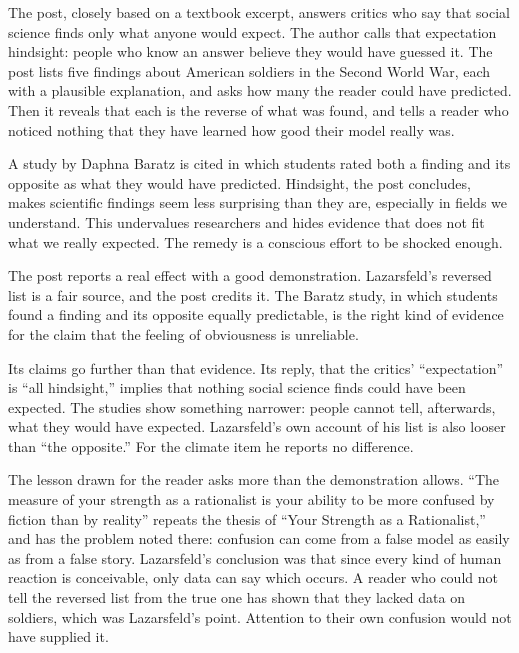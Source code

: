 \begin{afterword}
\summaryhead

The post, closely based on a textbook excerpt, answers critics who say that social science finds only what anyone would expect. The author calls that expectation hindsight: people who know an answer believe they would have guessed it. The post lists five findings about American soldiers in the Second World War, each with a plausible explanation, and asks how many the reader could have predicted. Then it reveals that each is the reverse of what was found, and tells a reader who noticed nothing that they have learned how good their model really was.

A study by Daphna Baratz is cited in which students rated both a finding and its opposite as what they would have predicted. Hindsight, the post concludes, makes scientific findings seem less surprising than they are, especially in fields we understand. This undervalues researchers and hides evidence that does not fit what we really expected. The remedy is a conscious effort to be shocked enough.

\responsehead

The post reports a real effect with a good demonstration. Lazarsfeld's reversed list is a fair source, and the post credits it. The Baratz study, in which students found a finding and its opposite equally predictable, is the right kind of evidence for the claim that the feeling of obviousness is unreliable.

Its claims go further than that evidence. Its reply, that the critics' ``expectation'' is ``all hindsight,'' implies that nothing social science finds could have been expected. The studies show something narrower: people cannot tell, afterwards, what they would have expected. Lazarsfeld's own account of his list is also looser than ``the opposite.'' For the climate item he reports no difference.

The lesson drawn for the reader asks more than the demonstration allows. ``The measure of your strength as a rationalist is your ability to be more confused by fiction than by reality'' repeats the thesis of ``Your Strength as a Rationalist,'' and has the problem noted there: confusion can come from a false model as easily as from a false story. Lazarsfeld's conclusion was that since every kind of human reaction is conceivable, only data can say which occurs. A reader who could not tell the reversed list from the true one has shown that they lacked data on soldiers, which was Lazarsfeld's point. Attention to their own confusion would not have supplied it.


\end{afterword}
